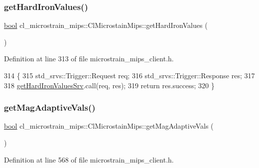\subsubsection{\texorpdfstring{get\+Hard\+Iron\+Values()}{getHardIronValues()}}
{\footnotesize\ttfamily \hyperlink{classbool}{bool} cl\+\_\+microstrain\+\_\+mips\+::\+Cl\+Microstain\+Mips\+::get\+Hard\+Iron\+Values (\begin{DoxyParamCaption}{ }\end{DoxyParamCaption})\hspace{0.3cm}{\ttfamily [inline]}}



Definition at line 313 of file microstrain\+\_\+mips\+\_\+client.\+h.


\begin{DoxyCode}
314     \{
315         std\_srvs::Trigger::Request req;
316         std\_srvs::Trigger::Response res;
317 
318         \hyperlink{classcl__microstrain__mips_1_1ClMicrostainMips_a11169f770102e9cff7f3b45c96fb4881}{getHardIronValuesSrv}.call(req, res);
319         \textcolor{keywordflow}{return} res.success;
320     \}
\end{DoxyCode}
\mbox{\label{classcl__microstrain__mips_1_1ClMicrostainMips_a704dbe24f752c360b09c82234d4c928f}} 
\subsubsection{\texorpdfstring{get\+Mag\+Adaptive\+Vals()}{getMagAdaptiveVals()}}
{\footnotesize\ttfamily \hyperlink{classbool}{bool} cl\+\_\+microstrain\+\_\+mips\+::\+Cl\+Microstain\+Mips\+::get\+Mag\+Adaptive\+Vals (\begin{DoxyParamCaption}{ }\end{DoxyParamCaption})\hspace{0.3cm}{\ttfamily [inline]}}



Definition at line 568 of file microstrain\+\_\+mips\+\_\+client.\+h.


